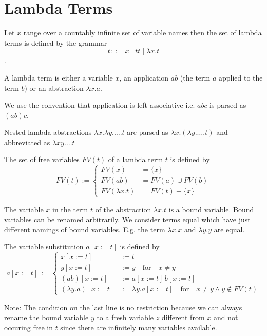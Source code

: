 \section{Lambda Terms}

\begin{definition}
  Let $x$ range over a countably infinite set of variable names then the set
  of lambda terms is defined by the grammar $$t ::= x \mid t t \mid \lambda x. t$$.
\end{definition}

A lambda term is either a variable $x$, an application $a b$ (the term $a$
applied to the term $b$) or an abstraction $\lambda x.a$.

We use the convention that application is left associative i.e. $a b c$ is
parsed as $(a b) c$.

Nested lambda abstractions $\lambda x. \lambda y. \ldots . t$ are parsed as
$\lambda x. (\lambda y. \ldots . t)$ and abbreviated as $\lambda x y \ldots . t$

\begin{definition}
  The set of free variables $FV(t)$ of a lambda term $t$ is defined by
  $$FV(t) :=
  \begin{cases} FV(x) &= \{x\} \\
     FV(a b) &= FV(a) \cup FV(b) \\
     FV(\lambda x. t) &= FV(t) - \{x\}
   \end{cases}
   $$
\end{definition}

The variable $x$ in the term $t$ of the abstraction $\lambda x.t$ is a bound
variable. Bound variables can be renamed arbitrarily. We consider terms equal
which have just different namings of bound variables. E.g. the term $\lambda
x.x$ and $\lambda y.y$ are equal.

\begin{definition}
  The variable substitution $a[x:=t]$ is defined by
  $$a[x:=t]~:=
  \begin{cases} x[x:=t]  &:= t \\
    y[x:=t] &:= y \quad \text{for}\quad x \ne y \\
    (a b)[x:=t] &:= a[x:=t] \, b[x:=t] \\
    (\lambda y.a)[x:=t]  &:= \lambda y. a[x:=t] \quad\text{for}\quad x \ne y
    \land y \notin FV(t)
   \end{cases}
   $$
\end{definition}

Note: The condition on the last line is no restriction because we can always
rename the bound variable $y$ to a fresh variable $z$ different from $x$ and
not occuring free in $t$ since there are infinitely many variables available.

